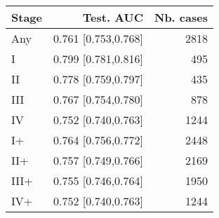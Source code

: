 \begin{table}[ht]
\centering
\begin{tabular}{lrr}
  \toprule
Stage & Test. AUC & Nb. cases \\ 
  \midrule
Any & 0.761 [0.753,0.768] & 2818 \\ 
   \addlinespace
I & 0.799 [0.781,0.816] & 495 \\ 
  II & 0.778 [0.759,0.797] & 435 \\ 
  III & 0.767 [0.754,0.780] & 878 \\ 
  IV & 0.752 [0.740,0.763] & 1244 \\ 
   \addlinespace
I+ & 0.764 [0.756,0.772] & 2448 \\ 
  II+ & 0.757 [0.749,0.766] & 2169 \\ 
  III+ & 0.755 [0.746,0.764] & 1950 \\ 
  IV+ & 0.752 [0.740,0.763] & 1244 \\ 
   \bottomrule
\end{tabular}
\end{table}
